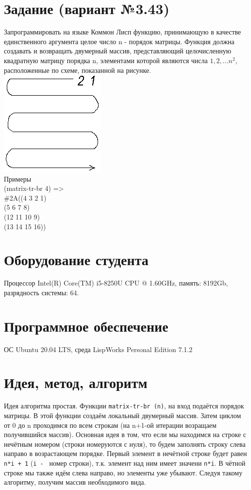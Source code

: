 \documentclass[12pt]{article}
\begin{document}
\section{Задание (вариант №3.43)}
{\large 
Запрограммировать на языке Коммон Лисп функцию, принимающую в качестве единственного 
аргумента целое число n - порядок матрицы. Функция должна создавать и возвращать 
двумерный массив, представляющий целочисленную квадратную матрицу порядка n, 
элементами которой являются числа {\tt $1, 2, ... n^2$}, расположенные по схеме, 
показанной на рисунке. \\
\includegraphics[scale=0.5]{example} \\
Примеры \\
(matrix-tr-br 4) => \\
\#2A((4  3   2  1) \\
    (5  6   7  8) \\
    (12 11 10  9) \\
    (13 14 15 16)) \\
	
}

\section{Оборудование студента}
{\large Процессор Intel(R) Core(TM) i5-8250U CPU @ 1.60GHz, память: 8192Gb, разрядность системы: 64.}

\section{Программное обеспечение}
{\large ОС Ubuntu 20.04 LTS, среда LispWorks Personal Edition 7.1.2}

\section{Идея, метод, алгоритм}
{\large 
Идея алгоритма простая. Функции {\tt matrix-tr-br (n)}, на вход подаётся порядок
матрицы. В этой функции создаём локальный двумерный массив. Затем циклом от 0 до n
проходимся по всем строкам (на n+1-ой итерации возращаем получившийся массив). 
Основная идея в том, что если мы находимся на строке с 
нечётным номером (строки номеруются с нуля), то будем заполнять строку слева направо
в возрастающем порядке. Первый элемент в нечётной строке будет равен {\tt n*i + 1} ({\tt i - } номер строки), т.к.
элемент над ним имеет значени {\tt n*i}. В чётной строке мы также идём слева направо, 
но элементы уже убывают. Следуя такому алгоритму, получим массив необходимого вида.
}
\end{document}
